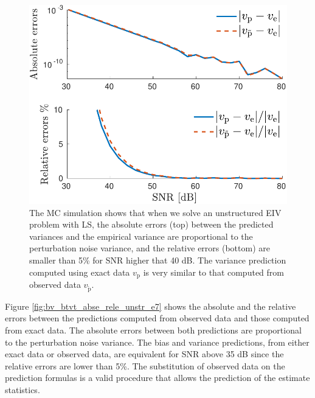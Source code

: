 \begin{figure}[htb!]
  \centering
  \includegraphics[width=1\columnwidth]{./ChapterStatisticalAnalysis/fig/Fig_3.pdf} 
  \caption{ \label{fig:v_vt_abse_rele_unstr_e7} The MC simulation shows that when we solve an unstructured EIV problem with LS, the absolute errors (top) between the predicted variances and the empirical variance are proportional to the perturbation noise variance, and the relative errors (bottom) are smaller than 5\% for SNR higher that 40 dB. The variance prediction computed using exact data ${v}_\mathrm{p}$ is very similar to that computed from observed data $v_{\widetilde{\mathrm{p}}}$. } 
\end{figure}

Figure \ref{fig:bv_btvt_abse_rele_unstr_e7} shows the absolute and the relative errors between the predictions computed from observed data and those computed from exact data.
The absolute errors between both predictions are proportional to the perturbation noise variance.
The bias and variance predictions, from either exact data or observed data, are equivalent for SNR above 35 dB since the relative errors are lower than 5\%.
The substitution of observed data on the prediction formulas is a valid procedure that allows the prediction of the estimate statistics.

